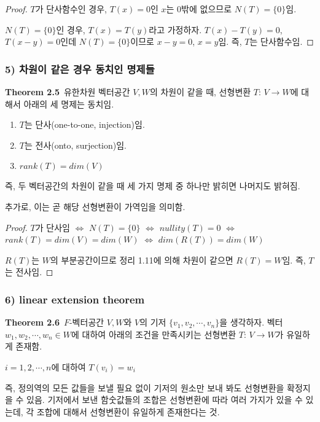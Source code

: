 \begin{proof}
$T$가 단사함수인 경우, $T(x)=0$인 $x$는 0밖에 없으므로 $N(T)=\{0\}$임.

$N(T)=\{0\}$인 경우, $T(x)=T(y)$라고 가정하자. $T(x)-T(y)=0$, $T(x-y)=0$인데 $N(T)=\{0\}$이므로 $x-y=0$, $x=y$임. 즉, $T$는 단사함수임.
\end{proof}

\subsubsection*{5) 차원이 같은 경우 동치인 명제들}
\textbf{Theorem 2.5}\, 유한차원 벡터공간 $V,W$의 차원이 같을 때, 선형변환 $T:\,V \rightarrow W$에 대해서 아래의 세 명제는 동치임.

\begin{enumerate}
    \item $T$는 단사(one-to-one, injection)임.
    \item $T$는 전사(onto, surjection)임.
    \item $rank(T)=dim(V)$
\end{enumerate}

즉, 두 벡터공간의 차원이 같을 때 세 가지 명제 중 하나만 밝히면 나머지도 밝혀짐.

추가로, 이는 곧 해당 선형변환이 가역임을 의미함.

\begin{proof}
$T$가 단사임 $\Leftrightarrow$ $N(T)=\{0\}$ $\Leftrightarrow$ $nullity(T)=0$ $\Leftrightarrow$ $rank(T)=dim(V)=dim(W)$ $\Leftrightarrow$ $dim(R(T))=dim(W)$

$R(T)$는 $W$의 부분공간이므로 정리 1.11에 의해 차원이 같으면 $R(T)=W$임. 즉, $T$는 전사임.
\end{proof}


\newpage


\subsubsection*{6) linear extension theorem}
\textbf{Theorem 2.6}\, $F$-벡터공간 $V,W$와 $V$의 기저 $\{v_1,v_2, \cdots ,v_n\}$을 생각하자. 벡터 $w_1,w_2, \cdots ,w_n \in W$에 대하여 아래의 조건을 만족시키는 선형변환 $T:\,V \rightarrow W$가 유일하게 존재함.\\

\begin{center}
$i=1,2, \cdots ,n$에 대하여 $T(v_i)=w_i$
\end{center}

즉, 정의역의 모든 값들을 보낼 필요 없이 기저의 원소만 보내 봐도 선형변환을 확정지을 수 있음. 기저에서 보낸 함숫값들의 조합은 선형변환에 따라 여러 가지가 있을 수 있는데, 각 조합에 대해서 선형변환이 유일하게 존재한다는 것.

